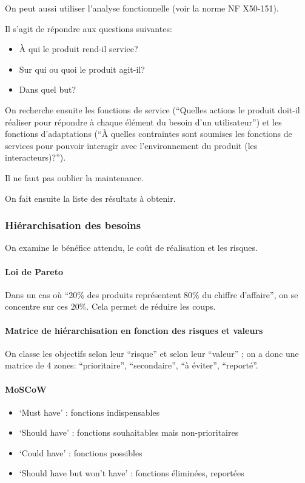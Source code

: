 \documentclass[10pt,a4paper,french]{article}
\begin{document}
On peut aussi utiliser l'analyse fonctionnelle (voir la norme NF X50-151).

Il s'agit de répondre aux questions suivantes:
\begin{itemize}
\item À qui le produit rend-il service?
\item Sur qui ou quoi le produit agit-il?
\item Dans quel but?
\end{itemize}

On recherche ensuite les fonctions de service (``Quelles actions le produit doit-il réaliser pour répondre à chaque élément du besoin d'un utilisateur'') et les fonctions d'adaptations (``À quelles contraintes sont soumises les fonctions de services pour pouvoir interagir avec l'environnement du produit (les interacteurs)?'').

Il ne faut pas oublier la maintenance.

On fait ensuite la liste des résultats à obtenir.

\subsubsection{Hiérarchisation des besoins}

On examine le bénéfice attendu, le coût de réalisation et les risques.

\paragraph{Loi de Pareto}
Dans un cas où ``20\% des produits représentent 80\% du chiffre d'affaire'', on se concentre sur ces 20\%. Cela permet de réduire les coups.

\paragraph{Matrice de hiérarchisation en fonction des risques et valeurs}
On classe les objectifs selon leur ``risque'' et selon leur ``valeur'' ; on a donc une matrice de 4 zones: ``prioritaire'', ``secondaire'', ``à éviter'', ``reporté''.

\paragraph{MoSCoW}
\begin{itemize}
\item `Must have' : fonctions indispensables
\item `Should have' : fonctions souhaitables mais non-prioritaires
\item `Could have' : fonctions possibles
\item `Should have but won't have' : fonctions éliminées, reportées 
\end{itemize}
\end{document}
